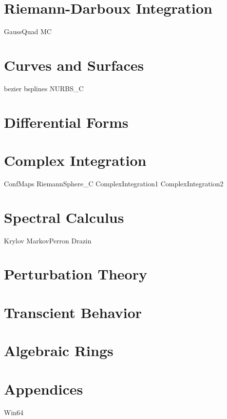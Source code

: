 \documentclass[nociteref]{newsiambook}
\begin{document}
\part{Riemann-Darboux Integration}
{GaussQuad}
{MC}

\part{Curves and Surfaces}
{bezier}
{bsplines}
{NURBS_C}

\part{Differential Forms}

\part{Complex Integration}
{ConfMaps}
{RiemannSphere_C}
{ComplexIntegration1}
{ComplexIntegration2}

\part{Spectral Calculus}
{Krylov}
{MarkovPerron}
{Drazin}

\part{Perturbation Theory}

\part{Transcient Behavior}

\part{Algebraic Rings}

\part{Appendices}
{Win64}
\end{document}
